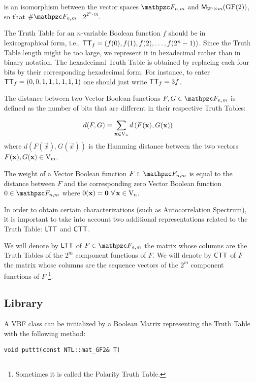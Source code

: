 is an isomorphism between the vector spaces $\funct{F}_{n,m}$ and $\matr{M}_{2^n \times m}(\gf{GF(2)})$, so that $\#\funct{F}_{n,m}$=$2^{2^n \cdot m}$.

The Truth Table for an $n$-variable Boolean function $f$ should be in
lexicographical form, i.e., $\matr{TT}_f = (f(0),f(1),f(2),\ldots,f(2^n-1))$. Since the
Truth Table length might be too large, we represent it in hexadecimal
rather than in binary notation. The hexadecimal Truth Table is obtained
by replacing each four bits by their corresponding
hexadecimal form. For instance, to enter $\matr{TT}_f = (0, 0, 1, 1, 1, 1, 1, 1)$
one should just write $\matr{TT}_f=3f$. 

The distance between two Vector Boolean functions $F, G \in \funct{F}_{n,m}$ is defined as the number of bits that are different in their respective Truth Tables:

\begin{equation}
d(F,G) = \sum_{\vec{x} \in \gf{V_n}} d \left( F(\vec{x}), G(\vec{x}) \right) 
\end{equation}
where $d\left( F(\vec{x}), G(\vec{x}) \right)$ is the Hamming distance between the two vectors $F(\vec{x}), G(\vec{x}) \in \gf{V_m}$.

The weight of a Vector Boolean function $F \in \funct{F}_{n,m}$ is equal to the distance between $F$ and the corresponding zero Vector Boolean function $0 \in \funct{F}_{n,m}$ where $0(\vec{x})=\vec{0} \ \fa \vec{x} \in \gf{V_n}$. 

In order to obtain certain characterizations (such as Autocorrelation Spectrum), it is important to take into account two additional representations related to the Truth Table: $\matr{LTT}$ and $\matr{CTT}$.

We will denote by $\matr{LTT}$ of $F \in \funct{F}_{n,m}$ the matrix whose columns are the Truth Tables of the $2^m$ component functions of $F$. We will denote by $\matr{CTT}$ of $F$ the matrix whose columns are the sequence vectors of the $2^m$ component functions of $F$ \footnote{Sometimes it is called the Polarity Truth Table.}. 

\subsection{Library}

A VBF class can be initialized by a Boolean Matrix representing the Truth Table with the following method:

\begin{verbatim}
void puttt(const NTL::mat_GF2& T)
\end{verbatim}

